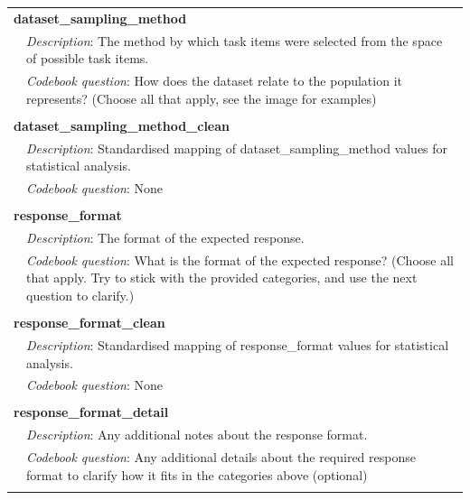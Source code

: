 {\begin{longtable}{p{}p{}}
\\
\multicolumn{2}{l}{\textbf{dataset\_sampling\_method}} \\
& \textit{Description}: The method by which task items were selected from the space of possible task items. \\
& \textit{Codebook question}: How does the dataset relate to the population it represents? (Choose all that apply, see the image for examples) \\
\\
\multicolumn{2}{l}{\textbf{dataset\_sampling\_method\_clean}} \\
& \textit{Description}: Standardised mapping of dataset\_sampling\_method values for statistical analysis. \\
& \textit{Codebook question}: None \\
\\
\multicolumn{2}{l}{\textbf{response\_format}} \\
& \textit{Description}: The format of the expected response. \\
& \textit{Codebook question}: What is the format of the expected response? (Choose all that apply. Try to stick with the provided categories, and use the next question to clarify.) \\
\\
\multicolumn{2}{l}{\textbf{response\_format\_clean}} \\
& \textit{Description}: Standardised mapping of response\_format values for statistical analysis. \\
& \textit{Codebook question}: None \\
\\
\multicolumn{2}{l}{\textbf{response\_format\_detail}} \\
& \textit{Description}: Any additional notes about the response format. \\
& \textit{Codebook question}: Any additional details about the required response format to clarify how it fits in the categories above (optional) \\
\\
\end{longtable}}

